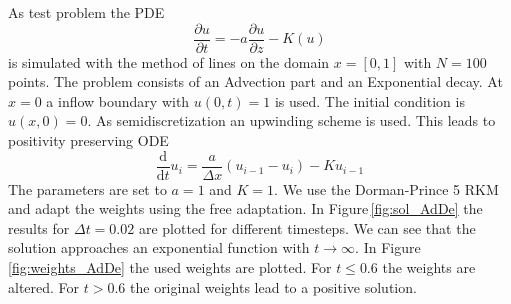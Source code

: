 \documentclass[a4paper]{article}
\numberwithin{equation}{section}
\theoremstyle{plain}
\theoremstyle{definition}
\numberwithin{theorem}{section}
\newcommand{\1}{\mathbbm{1}}
\begin{document}
As test problem the PDE
\begin{equation}
\frac{\partial u}{\partial t} = -a \frac{\partial u}{\partial z} - K (u)
\end{equation}
is simulated with the method of lines on the domain $x = [0,1]$ with $N =100$ points. The problem consists of an Advection part and an Exponential decay. At $x=0$ a inflow boundary with $u(0,t)=1$ is used. The initial condition is $u(x,0)=0$.
As semidiscretization an upwinding scheme is used. This leads to positivity preserving ODE
\begin{equation}
\frac{\mathrm d}{\mathrm d t} u_i = \frac{a}{\Delta x} \left( u_{i-1} - u_i \right) - K u_{i-1}
\end{equation}
The parameters are set to $a=1$ and $K=1$.
We use the Dorman-Prince 5 RKM and adapt the weights using the free adaptation.
In Figure\,\ref{fig:sol_AdDe} the results for $\Delta t = 0.02$ are plotted for different timesteps. We can see that the solution approaches an exponential function with $t \rightarrow \infty$.
In Figure\,\ref{fig:weights_AdDe} the used weights are plotted. For $t\leq 0.6$ the weights are altered. For $t > 0.6$ the original weights lead to a positive solution.
\end{document}
